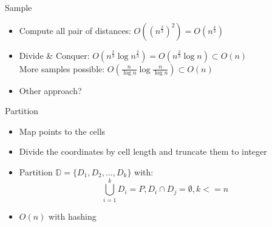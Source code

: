 \documentclass[18pt]{beamer}
\def \loose {15pt}
\begin{document}

\begin{frame}{Sample}
	\begin{itemize}
	\setlength{\itemsep}{\loose}
		\item Compute all pair of distances: $O((n^{\frac{2}{3}})^2) = O(n^{\frac{4}{3}})$
		\item Divide \& Conquer: $O(n^{\frac{2}{3}}\log n^{\frac{2}{3}}) = O(n^{\frac{2}{3}}\log n) \subset O(n)$ \\
		\hspace{1em} More samples possible: $O(\frac{n}{\log n} \log \frac{n}{\log n}) \subset O(n) $
		\item Other approach?
	\end{itemize}
\end{frame}

\begin{frame}{Partition}
	\begin{itemize}
		\setlength{\itemsep}{\loose}
		\item Map points to the cells
		\item Divide the coordinates by cell length and truncate them to integer

		\item Partition $\mathbb{D} = \{D_1, D_2, ..., D_k\}$ with:
			 $$\bigcup_{i=1}^k D_i = P, D_i \cap D_j = \emptyset, k <= n$$
				\item $O(n)$ with hashing
	\end{itemize}
\end{frame}
\end{document}
